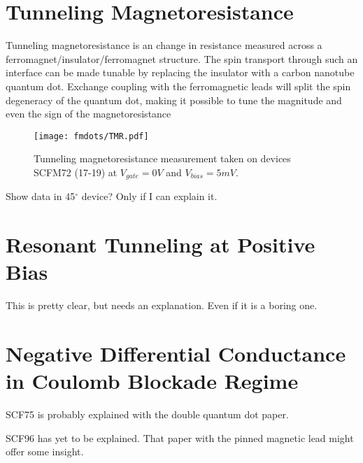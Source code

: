 \section{Tunneling Magnetoresistance}

Tunneling magnetoresistance is an change in resistance measured across a ferromagnet/insulator/ferromagnet structure. The spin transport through such an interface can be made tunable by replacing the insulator with a carbon nanotube quantum dot. Exchange coupling with the ferromagnetic leads will split the spin degeneracy of the quantum dot, making it possible to tune the magnitude and even the sign of the magnetoresistance \cite{...}

\begin{figure}
    \centering
    \texttt{[image: fmdots/TMR.pdf]}
    \caption{Tunneling magnetoresistance measurement taken on devices SCFM72 (17-19) at $V_{gate} = 0V$ and $V_{bias} = 5mV$.}
    \label{fig:TMR_real}
\end{figure}

Show data in 45$^\circ$ device? Only if I can explain it.

\section{Resonant Tunneling at Positive Bias}

This is pretty clear, but needs an explanation. Even if it is a boring one.

\section{Negative Differential Conductance in Coulomb Blockade Regime}

SCF75 is probably explained with the double quantum dot paper.

SCF96 has yet to be explained. That paper with the pinned magnetic lead might offer some insight.